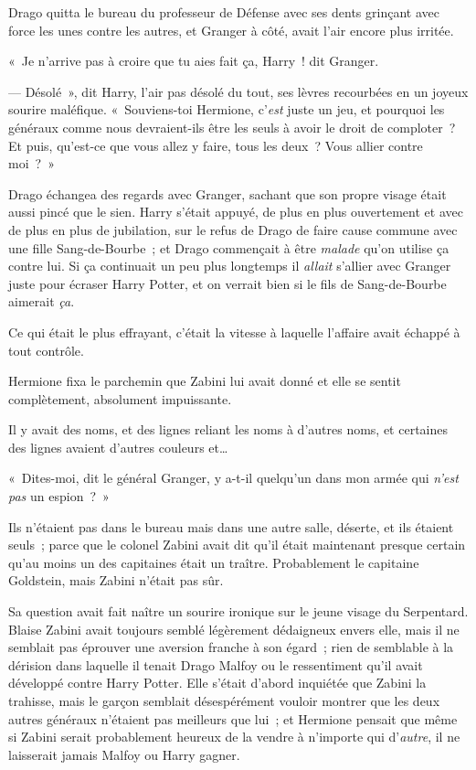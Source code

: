 Drago quitta le bureau du professeur de Défense avec ses dents grinçant avec force les unes contre les autres, et Granger à côté, avait l'air encore plus irritée.

«~Je n'arrive pas à croire que tu aies fait ça, Harry~! dit Granger.

--- Désolé~», dit Harry, l'air pas désolé du tout, ses lèvres recourbées en un joyeux sourire maléfique. «~Souviens-toi Hermione, c'\emph{est} juste un jeu, et pourquoi les généraux comme nous devraient-ils être les seuls à avoir le droit de comploter~? Et puis, qu'est-ce que vous allez y faire, tous les deux~? Vous allier contre moi~?~»

Drago échangea des regards avec Granger, sachant que son propre visage était aussi pincé que le sien. Harry s'était appuyé, de plus en plus ouvertement et avec de plus en plus de jubilation, sur le refus de Drago de faire cause commune avec une fille Sang-de-Bourbe~; et Drago commençait à être \emph{malade} qu'on utilise ça contre lui. Si ça continuait un peu plus longtemps il \emph{allait} s'allier avec Granger juste pour écraser Harry Potter, et on verrait bien si le fils de Sang-de-Bourbe aimerait \emph{ça}.

\later

Ce qui était le plus effrayant, c'était la vitesse à laquelle l'affaire avait échappé à tout contrôle.

Hermione fixa le parchemin que Zabini lui avait donné et elle se sentit complètement, absolument impuissante.

Il y avait des noms, et des lignes reliant les noms à d'autres noms, et certaines des lignes avaient d'autres couleurs et…

«~Dites-moi, dit le général Granger, y a-t-il quelqu'un dans mon armée qui \emph{n'est pas} un espion~?~»

Ils n'étaient pas dans le bureau mais dans une autre salle, déserte, et ils étaient seuls~; parce que le colonel Zabini avait dit qu'il était maintenant presque certain qu'au moins un des capitaines était un traître. Probablement le capitaine Goldstein, mais Zabini n'était pas sûr.

Sa question avait fait naître un sourire ironique sur le jeune visage du Serpentard. Blaise Zabini avait toujours semblé légèrement dédaigneux envers elle, mais il ne semblait pas éprouver une aversion franche à son égard~; rien de semblable à la dérision dans laquelle il tenait Drago Malfoy ou le ressentiment qu'il avait développé contre Harry Potter. Elle s'était d'abord inquiétée que Zabini la trahisse, mais le garçon semblait désespérément vouloir montrer que les deux autres généraux n'étaient pas meilleurs que lui~; et Hermione pensait que même si Zabini serait probablement heureux de la vendre à n'importe qui d'\emph{autre}, il ne laisserait jamais Malfoy ou Harry gagner.

